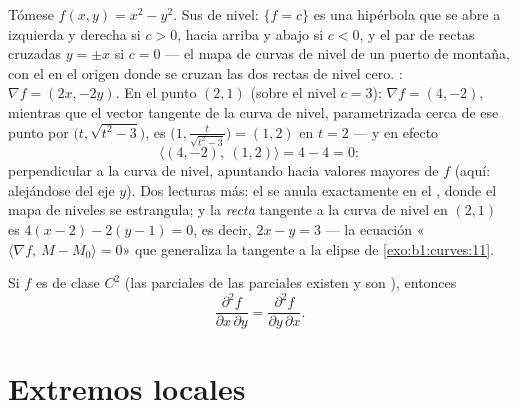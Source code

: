 \begin{example}
\label{ex:b1:multivar:levelcurves}
Tómese $f(x, y) = x^2 - y^2$. Sus  de nivel: $\{f = c\}$ es una
hipérbola que se abre a izquierda y derecha si $c > 0$, hacia arriba y abajo si $c < 0$,
y el par de rectas cruzadas $y = \pm x$ si $c = 0$ --- el
mapa de curvas de nivel de un puerto de montaña, con el  en el
origen donde se cruzan las dos rectas de nivel cero. : $\nabla
f = (2x, -2y)$. En el punto $(2, 1)$ (sobre el nivel $c = 3$):
$\nabla f = (4, -2)$, mientras que el vector tangente de la curva
de nivel, parametrizada cerca de ese punto por $\bigl(t,
\sqrt{t^2 - 3}\bigr)$, es $\bigl(1, \frac{t}{\sqrt{t^2 -
3}}\bigr) = (1, 2)$ en $t = 2$ --- y en efecto
\[
\langle (4, -2),\ (1, 2)\rangle = 4 - 4 = 0 :
\]
 perpendicular a la curva de nivel, apuntando hacia valores
mayores de $f$ (aquí: alejándose del eje $y$). Dos lecturas
más: el  se anula exactamente en el , donde
el mapa de niveles se estrangula; y la \emph{recta} tangente a la
curva de nivel en $(2,1)$ es $4(x - 2) - 2(y - 1) = 0$, es decir, $2x -
y = 3$ --- la ecuación «$\langle \nabla f,\ M - M_0\rangle =
0$» que generaliza la tangente a la elipse de
\cref{exo:b1:curves:11}.
\end{example}

\begin{theorem}[Schwarz]\label{thm:b1:multivar:schwarz}
Si $f$ es de clase $C^2$ (las parciales de las parciales existen y son
), entonces
\[
\frac{\partial^2 f}{\partial x\,\partial y}
= \frac{\partial^2 f}{\partial y\,\partial x} .
\]
\end{theorem}
\admitted

\section{Extremos locales}

